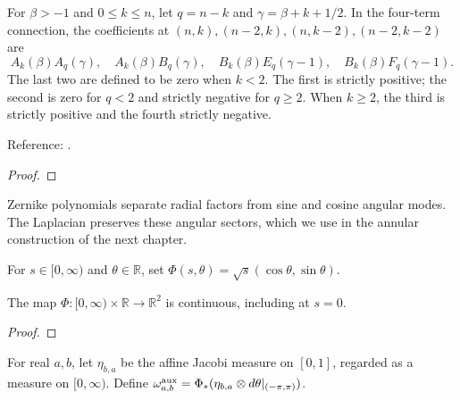 \begin{supporting}
\begin{theorem}
\label{thm:dunkl-xu-raising-coefficients}
\leanok
For $\beta>-1$ and $0\le k\le n$, let $q=n-k$ and $\gamma=\beta+k+1/2$.
In the four-term connection, the coefficients at $(n,k),(n-2,k),(n,k-2),(n-2,k-2)$ are
\[
 A_k(\beta)A_q(\gamma),\quad A_k(\beta)B_q(\gamma),\quad
 B_k(\beta)E_q(\gamma-1),\quad B_k(\beta)F_q(\gamma-1).
\]
The last two are defined to be zero when $k<2$. The first is strictly positive;
the second is zero for $q<2$ and strictly negative for $q\ge2$.
When $k\ge2$, the third is strictly positive and the fourth strictly negative.

Reference: \cite[Section 2.3]{dunkl-xu}.
\end{theorem}
\begin{proof}
\leanok
\end{proof}

Zernike polynomials separate radial factors from sine and cosine angular
modes. The Laplacian preserves these angular sectors, which we use in the
annular construction of the next chapter.

\begin{definition}
\label{def:zernike-coordinates}
\leanok
For $s\in[0,\infty)$ and $\theta\in\mathbb R$, set $\Phi(s,\theta)=\sqrt{s}(\cos\theta,\sin\theta)$.
\end{definition}

\begin{theorem}
\label{thm:zernike-coordinates}
\leanok
The map $\Phi:[0,\infty)\times\mathbb R\to\mathbb R^2$ is continuous, including at $s=0$.
\end{theorem}
\begin{proof}
\leanok
\end{proof}

\begin{definition}
\label{def:zernike-product-measure}
\leanok
For real $a,b$, let $\eta_{b,a}$ be the affine Jacobi measure on $[0,1]$, regarded as a measure on $[0,\infty)$. Define $\omega^{\rm aux}_{a,b}=\Phi_*(\eta_{b,a}\otimes d\theta|_{(-\pi,\pi)})$.
\end{definition}


\end{supporting}
